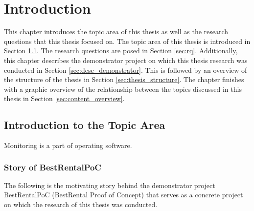 \chapter{Introduction}
\label{cha:introduction}

This chapter introduces the topic area of this thesis as well as the research questions
that this thesis focused on. The topic area of this thesis is introduced in Section \ref{sec:intro_topic}.
The research questions are posed in Section \ref{sec:rq}. Additionally,
this chapter describes the demonstrator project on which this thesis research
was conducted in Section \ref{sec:desc_demonstrator}. This is followed by an overview
of the structure of the thesis in Section \ref{sec:thesis_structure}. The chapter finishes
with a graphic overview of the relationship between the topics discussed in this thesis
in Section \ref{sec:content_overview}.

\section{Introduction to the Topic Area}
\label{sec:intro_topic}


Monitoring is a part of operating software.

\subsection*{Story of BestRentalPoC}

The following is the motivating story behind the demonstrator project BestRentalPoC
(BestRental Proof of Concept) that serves as a concrete project
on which the research of this thesis was conducted.

